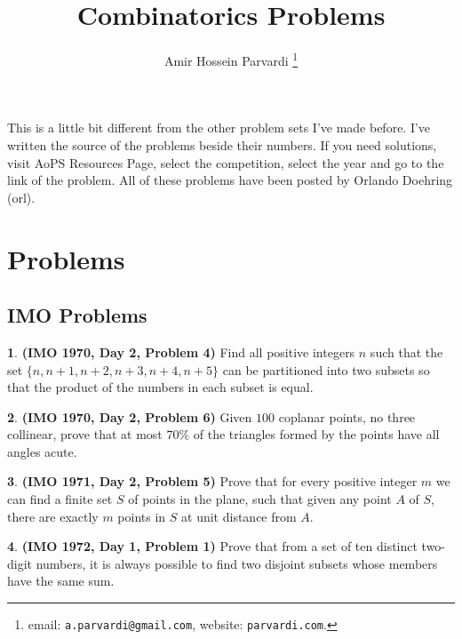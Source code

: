 \documentclass{article}
\theoremstyle{definition}
\newtheorem{p}{}
\begin{document}
\title{Combinatorics Problems}\author{Amir Hossein Parvardi \thanks {email: \texttt{a.parvardi@gmail.com}, website: \texttt{parvardi.com}.}} \maketitle 
This is a little bit different from the other problem sets I've made before. I've written the source of the problems beside their numbers. If you need solutions, visit AoPS Resources Page, select the competition, select the year and go to the link of the problem. All of these problems have been posted by Orlando Doehring (orl).

\tableofcontents

\section{Problems}

\subsection{IMO Problems}






\begin{p}{\bf (IMO 1970, Day 2, Problem 4)}
Find all positive integers $n$ such that the set $\{n,n+1,n+2,n+3,n+4,n+5\}$ can be partitioned into two subsets so that the product of the numbers in each subset is equal.
\end{p}





\begin{p}{\bf (IMO 1970, Day 2, Problem 6)}
Given $100$ coplanar points, no three collinear, prove that at most $70\%$ of the triangles formed by the points have all angles acute.
\end{p}



\begin{p}{\bf (IMO 1971, Day 2, Problem 5)}
Prove that for every positive integer $m$ we can find a finite set $S$ of points in the plane, such that given any point $A$ of $S$, there are exactly $m$ points in $S$ at unit distance from $A$.
\end{p}




\begin{p}{\bf (IMO 1972, Day 1, Problem 1)}
Prove that from a set of ten distinct two-digit numbers, it is always possible to find two disjoint subsets whose members have the same sum.
\end{p}
\end{document}
